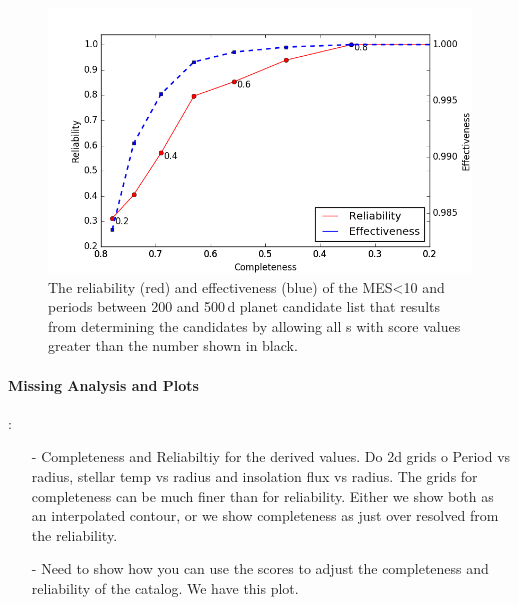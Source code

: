 \begin{figure}[h!]
 \begin{center}
  \includegraphics[width=1.0\linewidth]{fig-CRadjustScore-DR25.png}
  \caption{\label{f:adjscore}The reliability (red) and effectiveness (blue) of the MES<10 and periods between 200 and 500\,d planet candidate list that results from determining the candidates by allowing all \opstce s with score values greater than the number shown in black.}
 \end{center}
 \end{figure}

\paragraph{Missing Analysis and Plots}:
\begin{itemize} 

\item[-] Completeness and Reliabiltiy for the derived values.
Do 2d grids o Period vs radius, stellar temp vs radius and insolation flux vs radius.  The grids for completeness can be much finer than for reliability.  Either we show both as an interpolated contour, or we show completeness as just over resolved from the reliability. 

\item[-] Need to show how you can use the scores to adjust the completeness and reliability of the catalog. We have this plot.
\end{itemize}
